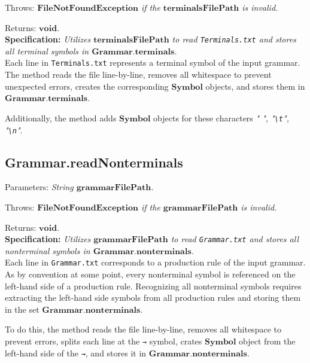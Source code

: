 Throws: \textit{\(\boldsymbol{FileNotFoundException}\) if the \(\boldsymbol{terminalsFilePath}\) is invalid.}

Returns: \textit{\(\boldsymbol{void}\).}\\

\textbf{Specification:} \textit{Utilizes \(\boldsymbol{terminalsFilePath}\) to read \texttt{Terminals.txt} and stores all terminal symbols in \(\boldsymbol{Grammar.terminals}\).}\\

Each line in \texttt{Terminals.txt} represents a terminal symbol of the input grammar. The method reads the file line-by-line, removes all whitespace to prevent unexpected errors, creates the corresponding \(\boldsymbol{Symbol}\) objects, and stores them in \(\boldsymbol{Grammar.terminals}\).

Additionally, the method adds \(\boldsymbol{Symbol}\) objects for these characters \textit{" ", "\texttt{\textbackslash t}", "\texttt{\textbackslash n}"}.

\vspace{30pt}

\subsection{Grammar.readNonterminals}

Parameters: \textit{String \(\boldsymbol{grammarFilePath}\).}

Throws: \textit{\(\boldsymbol{FileNotFoundException}\) if the \(\boldsymbol{grammarFilePath}\) is invalid.}

Returns: \textit{\(\boldsymbol{void}\).}\\

\textbf{Specification:} \textit{Utilizes \(\boldsymbol{grammarFilePath}\) to read \texttt{Grammar.txt} and stores all nonterminal symbols in \(\boldsymbol{Grammar.nonterminals}\).}\\

Each line in \texttt{Grammar.txt} corresponds to a production rule of the input grammar. As by convention at some point, every nonterminal symbol is referenced on the left-hand side of a production rule. Recognizing all nonterminal symbols requires extracting the left-hand side symbols from all production rules and storing them in the set \(\boldsymbol{Grammar.nonterminals}\).

To do this, the method reads the file line-by-line, removes all whitespace to prevent errors, splits each line at the \texttt{→} symbol, crates \(\boldsymbol{Symbol}\) object from the left-hand side of the \texttt{→}, and stores it in \(\boldsymbol{Grammar.nonterminals}\).

